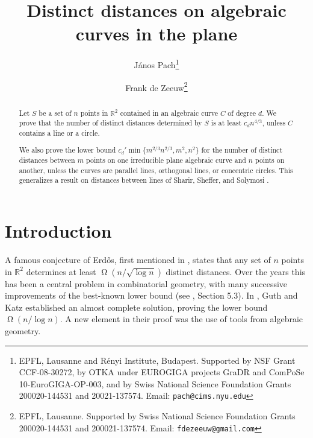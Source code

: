 \documentclass[12pt]{article}
\newcommand{\RR}{\mathbb R}
\begin{document}
\title{Distinct distances on algebraic curves in the plane}


\author{J\'anos Pach\thanks{EPFL, Lausanne and R\'enyi Institute,
    Budapest. Supported by NSF Grant CCF-08-30272, by OTKA under EUROGIGA
    projects GraDR and ComPoSe 10-EuroGIGA-OP-003, and by Swiss National
    Science Foundation Grants 200020-144531 and 20021-137574. 
    Email: {\tt pach@cims.nyu.edu}}
  \and 
    Frank de Zeeuw\thanks{EPFL, Lausanne. Supported by 
    Swiss National Science Foundation Grants 200020-144531 and 200021-137574.
    Email: {\tt fdezeeuw@gmail.com}}}

\date{}  
\maketitle

\begin{abstract}
Let $S$ be a set of $n$ points in $\RR^2$ contained in an algebraic curve $C$ of degree $d$.
We prove that the number of distinct distances determined by $S$ is at least $c_dn^{4/3}$, 
unless $C$ contains a line or a circle.

We also prove the lower bound $c_d' \min\{m^{2/3}n^{2/3}, m^2, n^2\}$
for the number of distinct distances between $m$ points on one irreducible plane algebraic curve and $n$ points on another,
unless the curves are parallel lines, orthogonal lines, or concentric circles.
This generalizes a result on distances between lines of Sharir, Sheffer, and Solymosi \cite{sharir:distances}.

\end{abstract}

\bigskip

\section{Introduction}

A famous conjecture of Erd\H os, first mentioned in \cite{erdos:distances}, 
states that any set of $n$ points in $\RR^2$
determines at least $\upOmega(n/\sqrt{\log n})$ distinct distances.
Over the years this has been a central problem in combinatorial geometry,
with many successive improvements of the best-known lower bound (see \cite{brass:problems}, Section 5.3).
In \cite{guth:distances}, Guth and Katz established an almost complete solution,
proving the lower bound $\upOmega(n/\log n)$.
A new element in their proof was the use of tools from algebraic geometry.
\end{document}
